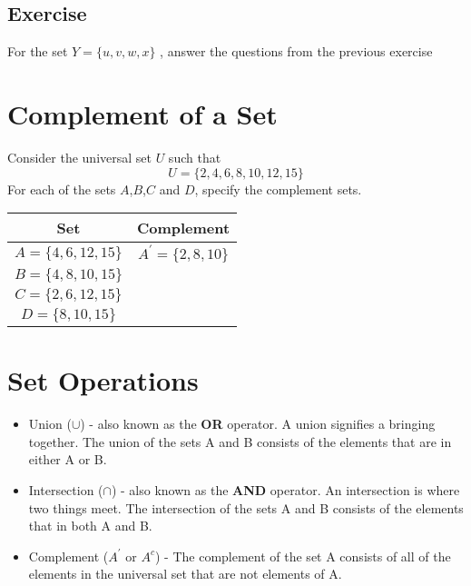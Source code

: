 \subsection*{Exercise}
For the set $Y = \{u,v,w,x\}$ , answer the questions from the
previous exercise



\section*{Complement of a Set}
Consider the universal set $U$ such that
\[U=\{2,4,6,8,10,12,15\} \]
For each of the sets $A$,$B$,$C$ and $D$, specify the complement sets.
{

\begin{center}
\begin{tabular}{|c|c|}
  \hline
Set &\phantom{sp} Complement \phantom{sp}\\
\hline \phantom{sp} $A=\{4,6,12,15\}$ \phantom{sp} &
$A^{\prime}=\{2,8,10\}$ \\ \hline $B=\{4,8,10,15\}$ & \\ \hline
$C=\{2,6,12,15\}$ & \\ \hline $D=\{8,10,15\}$ & \\ \hline

\end{tabular}
\end{center}
}

\newpage
\section*{Set Operations}
\begin{itemize}
\item Union ($\cup$) - also known as the \textbf{OR} operator. A union signifies a bringing together. The union of the sets A and B consists of the elements that are in either A or B.
\item Intersection ($\cap$) - also known as the \textbf{AND} operator. An intersection is where two things meet. The intersection of the sets A and B consists of the elements that in both A and B.
\item Complement ($A^{\prime}$ or $A^{c}$) - The complement of the set A consists of all of the elements in the universal set that are not elements of A.
\end{itemize}

